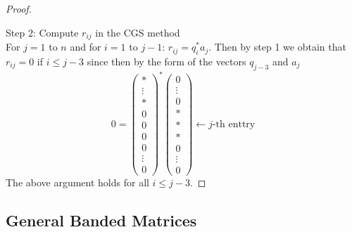 \documentclass{article}
\numberwithin{pic}{section}
\numberwithin{lem}{section}
\numberwithin{thm}{section}
\numberwithin{cor}{section}
\theoremstyle{definition}
\numberwithin{ex}{section}
\numberwithin{defn}{section}
\theoremstyle{definition}
\theoremstyle{remark}
\begin{document}
\begin{proof}
\begin{description}
\end{description}
Step 2: Compute $r_{ij}$ in the CGS method\\
For $j=1$ to $n$ and for $i=1$ to $j-1$: $r_{ij}= q_i^*a_j$.
Then by step 1 we obtain that $r_{ij}=0$ if $i\leq j-3$ since then by the form of the vectors $q_{j-3}$ and $a_j$
\[0=\begin{pmatrix}
* \\ 
\vdots  \\ 
* \\ 
0 \\ 
0 \\
0\\
0 \\
\vdots \\ 
0
\end{pmatrix}^*\begin{pmatrix}
0 \\ 
\vdots  \\ 
0 \\ 
* \\ 
* \\ 
*\\
0\\
\vdots\\
0
\end{pmatrix} \leftarrow j\text{-th enttry} \]
The above argument holds for all $i\leq j-3$. 
\end{proof}
\subsection{General Banded Matrices}
\end{document}
